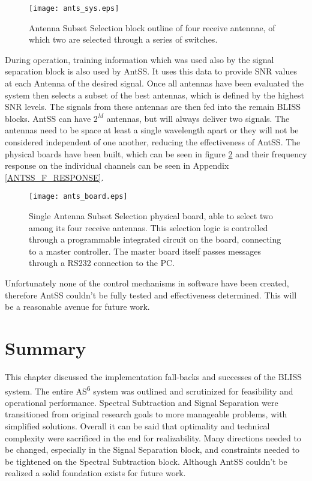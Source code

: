 \begin{figure}[!ht]
\centering
\texttt{[image: ants\_sys.eps]}
\caption{Antenna Subset Selection block outline of four receive antennae, of which two are selected through a series of switches.}
\label{ants_sys}
\end{figure}

During operation, training information which was used also by the signal separation block is also used by AntSS.  It uses this data to provide SNR values at each Antenna of the desired signal.  Once all antennas have been evaluated the system then selects a subset of the best antennas, which is defined by the highest SNR levels.  The signals from these antennas are then fed into the remain BLISS blocks.  AntSS can have \(2^{M}\) antennas, but will always deliver two signals.  The antennas need to be space at least a single wavelength apart or they will not be considered independent of one another, reducing the effectiveness of AntSS.  The physical boards have been built, which can be seen in figure \ref{antss_boards} and their frequency response on the individual channels can be seen in Appendix \ref{ANTSS_F_RESPONSE}.\\

\begin{figure}[!ht]
\centering
\texttt{[image: ants\_board.eps]}
\caption{Single Antenna Subset Selection physical board, able to select two among its four receive antennas.  This selection logic is controlled through a programmable integrated circuit on the board, connecting to a master controller.  The master board itself passes messages through a RS232 connection to the PC.}
\label{antss_boards}
\end{figure}

Unfortunately none of the control mechanisms in software have been created, therefore AntSS couldn't be fully tested and effectiveness determined.  This will be a reasonable avenue for future work.\\

\section{Summary}

This chapter discussed the implementation fall-backs and successes of the BLISS system.  The entire AS\textsuperscript{6} system was outlined and scrutinized for feasibility and operational performance.  Spectral Subtraction and Signal Separation were transitioned from original research goals to more manageable problems, with simplified solutions.  Overall it can be said that optimality and technical complexity were sacrificed in the end for realizability.  Many directions needed to be changed, especially in the Signal Separation block, and constraints needed to be tightened on the Spectral Subtraction block.  Although AntSS couldn't be realized a solid foundation exists for future work.\\ 




